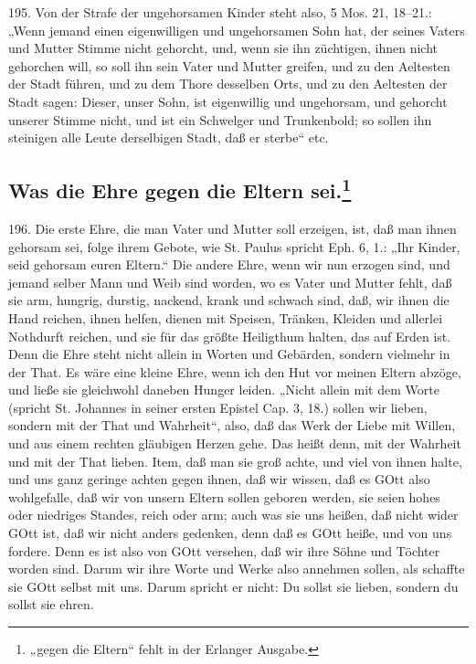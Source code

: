 195. Von der Strafe der ungehorsamen Kinder steht also, 5 Mos. 21, 18–21.: „Wenn jemand einen eigenwilligen und ungehorsamen Sohn hat, der seines Vaters und Mutter Stimme nicht gehorcht, und, wenn sie ihn züchtigen, ihnen nicht gehorchen will, so soll ihn sein Vater und Mutter greifen, und zu den Aeltesten der Stadt führen, und zu dem Thore desselben Orts, und zu den Aeltesten der Stadt sagen: Dieser, unser Sohn, ist eigenwillig und ungehorsam, und gehorcht unserer Stimme nicht, und ist ein Schwelger und Trunkenbold; so sollen ihn steinigen alle Leute derselbigen Stadt, daß er sterbe“ etc.

\subsection[Was die Ehre gegen die Eltern sei]{Was die Ehre gegen die Eltern sei.\footnote{„gegen die Eltern“ fehlt in der Erlanger Ausgabe.}}

196. Die erste Ehre, die man Vater und Mutter soll erzeigen, ist, daß man ihnen gehorsam sei, folge ihrem Gebote, wie St. Paulus spricht Eph. 6, 1.: „Ihr Kinder, seid gehorsam euren Eltern.“ Die andere Ehre, wenn wir nun erzogen sind, und jemand selber Mann und Weib sind worden, wo es Vater und Mutter fehlt, daß sie arm, hungrig, durstig, nackend, krank und schwach sind, daß, wir ihnen die Hand reichen, ihnen helfen, dienen mit Speisen, Tränken, Kleiden und allerlei Nothdurft reichen, und sie für das größte Heiligthum halten, das auf Erden ist. Denn die Ehre steht nicht allein in Worten und Gebärden, sondern vielmehr in der That. Es wäre eine kleine Ehre, wenn ich den Hut vor meinen Eltern abzöge, und ließe sie gleichwohl daneben Hunger leiden. „Nicht allein mit dem Worte (spricht St. Johannes in seiner ersten Epistel Cap. 3, 18.) sollen wir lieben, sondern mit der That und Wahrheit“, also, daß das Werk der Liebe mit Willen, und aus einem rechten gläubigen Herzen gehe. Das heißt denn, mit der Wahrheit und mit der That lieben. Item, daß man sie groß achte, und viel von ihnen halte, und uns ganz geringe achten gegen ihnen, daß wir wissen, daß es GOtt also wohlgefalle, daß wir von unsern Eltern sollen geboren werden, sie seien hohes oder niedriges Standes, reich oder arm; auch was sie uns heißen, daß nicht wider GOtt ist, daß wir nicht anders gedenken, denn daß es GOtt heiße, und von uns fordere. Denn es ist also von GOtt versehen, daß wir ihre Söhne und Töchter worden sind. Darum wir ihre Worte und Werke also annehmen sollen, als schaffte sie GOtt selbst mit uns. Darum spricht er nicht: Du sollst sie lieben, sondern du sollst sie ehren.

